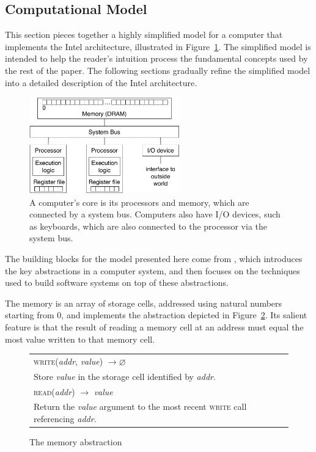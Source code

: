 \subsection{Computational Model}
\label{sec:resources}

This section pieces together a highly simplified model for a computer that
implements the Intel architecture, illustrated in
Figure~\ref{fig:computer_model}. The simplified model is intended to help the
reader's intuition process the fundamental concepts used by the rest of the
paper. The following sections gradually refine the simplified model into a
detailed description of the Intel architecture.

\begin{figure}[hbt]
  \centering
  \includegraphics[width=65mm]{figures/computer_model.pdf}
  \caption{
    A computer's core is its processors and memory, which are connected by a
    system bus. Computers also have I/O devices, such as keyboards, which are
    also connected to the processor via the system bus.
  }
  \label{fig:computer_model}
\end{figure}


The building blocks for the model presented here come from
\cite{saltzer2009systemdesign}, which introduces the key abstractions in a
computer system, and  then focuses on the techniques used to build software
systems on top of these abstractions.

The memory is an array of storage cells, addressed using natural numbers
starting from 0, and implements the abstraction depicted in
Figure~\ref{fig:memory_abstraction}. Its salient feature is that the result of
reading a memory cell at an address must equal the most value written to that
memory cell.

\begin{figure}[hbt]
  \centering
  \begin{tabularx}{\columnwidth}{| X |}
  \hline
  \textsc{write}(\textit{addr}, \textit{value}) $ \rightarrow \varnothing $ \\
  Store \textit{value} in the storage cell identified by \textit{addr}. \\
  \hline
  \textsc{read}(\textit{addr}) $ \rightarrow $ \textit{value} \\
  Return the \textit{value} argument to the most recent \textsc{write} call
  referencing \textit{addr}. \\
  \hline
  \end{tabularx}
  \caption{The memory abstraction}
  \label{fig:memory_abstraction}
\end{figure}

